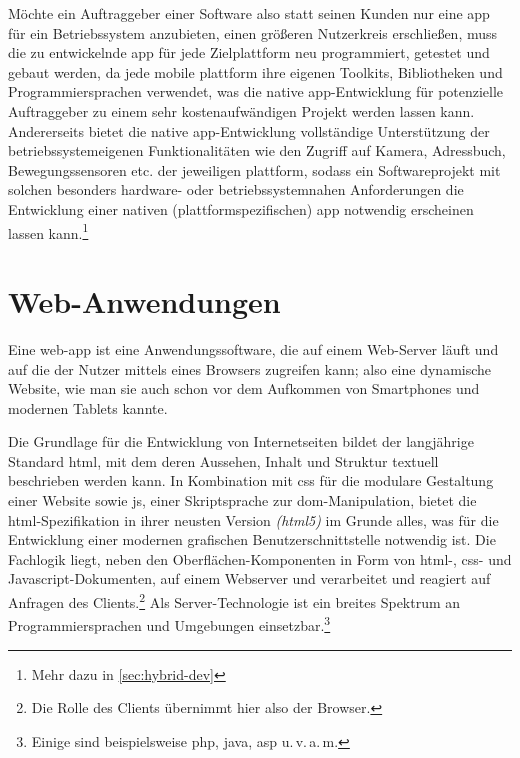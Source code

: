 Möchte ein Auftraggeber einer Software also statt seinen Kunden nur eine \gls{app} für ein Betriebssystem anzubieten, einen größeren Nutzerkreis erschließen, muss die zu entwickelnde \gls{app} für jede Zielplattform neu programmiert, getestet und gebaut werden, da jede mobile \gls{plattform} ihre eigenen Toolkits, Bibliotheken und Programmiersprachen verwendet, was die native \gls{app}-Entwicklung für potenzielle Auftraggeber zu einem sehr kostenaufwändigen Projekt werden lassen kann.
Andererseits bietet die native \gls{app}-Entwicklung vollständige Unterstützung der betriebssystemeigenen Funktionalitäten wie den Zugriff auf Kamera, Adressbuch, Bewegungssensoren etc. der jeweiligen \gls{plattform}, sodass ein Softwareprojekt mit solchen besonders hardware- oder betriebssystemnahen Anforderungen die Entwicklung einer nativen (plattformspezifischen) \gls{app} notwendig erscheinen lassen kann.\footnote{Mehr dazu in \autoref{sec:hybrid-dev}}

\section{Web-Anwendungen}\label{sec:web-app}

Eine \gls{web-app} ist eine Anwendungssoftware, die auf einem Web-Server läuft und auf die der Nutzer mittels eines Browsers zugreifen kann; also eine dynamische Website, wie man sie auch schon vor dem Aufkommen von Smartphones und modernen Tablets kannte. 

Die Grundlage für die Entwicklung von Internetseiten bildet der langjährige Standard \gls{html}, mit dem deren Aussehen, Inhalt und Struktur textuell beschrieben werden kann. 
In Kombination mit \gls{css} für die modulare Gestaltung einer Website sowie \gls{js}, einer Skriptsprache zur \gls{dom}-Manipulation, bietet die \gls{html}-Spezifikation in ihrer neusten Version \textit{(\gls{html5})} im Grunde alles, was für die Entwicklung einer modernen grafischen Benutzerschnittstelle notwendig ist. 
Die Fachlogik liegt, neben den Oberflächen-Komponenten in Form von \mbox{\gls{html}-,} \gls{css}- und Javascript-Dokumenten, auf einem Webserver und verarbeitet und reagiert auf Anfragen des Clients.\footnote{Die Rolle des Clients übernimmt hier also der Browser.}
Als Server-Technologie ist ein breites Spektrum an Programmiersprachen und Umgebungen einsetzbar.\footnote{Einige sind beispielsweise \gls*{php}, \gls*{java}, \gls*{asp} u.\,v.\,a.\,m.}

